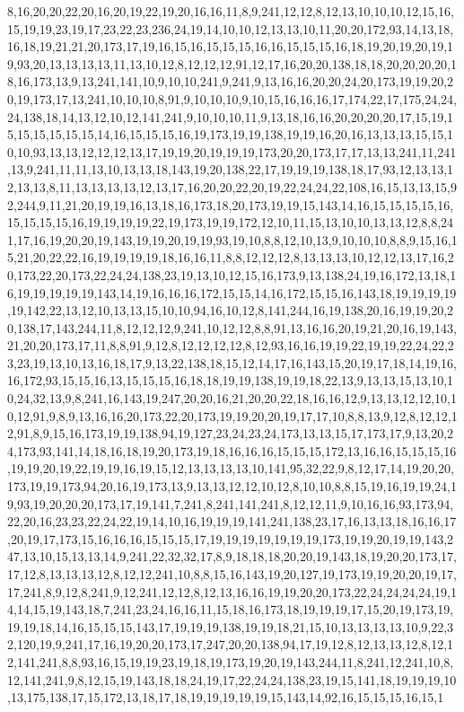 8,16,20,20,22,20,16,20,19,22,19,20,16,16,11,8,9,241,12,12,8,12,13,10,10,10,12,15,16,15,19,19,23,19,17,23,22,23,236,24,19,14,10,10,12,13,13,10,11,20,20,172,93,14,13,18,16,18,19,21,21,20,173,17,19,16,15,16,15,15,15,16,16,15,15,15,16,18,19,20,19,20,19,19,93,20,13,13,13,13,11,13,10,12,8,12,12,12,91,12,17,16,20,20,138,18,18,20,20,20,20,18,16,173,13,9,13,241,141,10,9,10,10,241,9,241,9,13,16,16,20,20,24,20,173,19,19,20,20,19,173,17,13,241,10,10,10,8,91,9,10,10,10,9,10,15,16,16,16,17,174,22,17,175,24,24,24,138,18,14,13,12,10,12,141,241,9,10,10,10,11,9,13,18,16,16,20,20,20,20,17,15,19,15,15,15,15,15,15,14,16,15,15,15,16,19,173,19,19,138,19,19,16,20,16,13,13,13,15,15,10,10,93,13,13,12,12,12,13,17,19,19,20,19,19,19,173,20,20,173,17,17,13,13,241,11,241,13,9,241,11,11,13,10,13,13,18,143,19,20,138,22,17,19,19,19,138,18,17,93,12,13,13,12,13,13,8,11,13,13,13,13,12,13,17,16,20,20,22,20,19,22,24,24,22,108,16,15,13,13,15,92,244,9,11,21,20,19,19,16,13,18,16,173,18,20,173,19,19,15,143,14,16,15,15,15,15,16,15,15,15,15,16,19,19,19,19,22,19,173,19,19,172,12,10,11,15,13,10,10,13,13,12,8,8,241,17,16,19,20,20,19,143,19,19,20,19,19,93,19,10,8,8,12,10,13,9,10,10,10,8,8,9,15,16,15,21,20,22,22,16,19,19,19,19,18,16,16,11,8,8,12,12,12,8,13,13,13,10,12,12,13,17,16,20,173,22,20,173,22,24,24,138,23,19,13,10,12,15,16,173,9,13,138,24,19,16,172,13,18,16,19,19,19,19,19,143,14,19,16,16,16,172,15,15,14,16,172,15,15,16,143,18,19,19,19,19,19,142,22,13,12,10,13,13,15,10,10,94,16,10,12,8,141,244,16,19,138,20,16,19,19,20,20,138,17,143,244,11,8,12,12,12,9,241,10,12,12,8,8,91,13,16,16,20,19,21,20,16,19,143,21,20,20,173,17,11,8,8,91,9,12,8,12,12,12,12,8,12,93,16,16,19,19,22,19,19,22,24,22,23,23,19,13,10,13,16,18,17,9,13,22,138,18,15,12,14,17,16,143,15,20,19,17,18,14,19,16,16,172,93,15,15,16,13,15,15,15,16,18,18,19,19,138,19,19,18,22,13,9,13,13,15,13,10,10,24,32,13,9,8,241,16,143,19,247,20,20,16,21,20,20,22,18,16,16,12,9,13,13,12,12,10,10,12,91,9,8,9,13,16,16,20,173,22,20,173,19,19,20,20,19,17,17,10,8,8,13,9,12,8,12,12,12,91,8,9,15,16,173,19,19,138,94,19,127,23,24,23,24,173,13,13,15,17,173,17,9,13,20,24,173,93,141,14,18,16,18,19,20,173,19,18,16,16,16,15,15,15,172,13,16,16,15,15,15,16,19,19,20,19,22,19,19,16,19,15,12,13,13,13,13,10,141,95,32,22,9,8,12,17,14,19,20,20,173,19,19,173,94,20,16,19,173,13,9,13,13,12,12,10,12,8,10,10,8,8,15,19,16,19,19,24,19,93,19,20,20,20,173,17,19,141,7,241,8,241,141,241,8,12,12,11,9,10,16,16,93,173,94,22,20,16,23,23,22,24,22,19,14,10,16,19,19,19,141,241,138,23,17,16,13,13,18,16,16,17,20,19,17,173,15,16,16,16,15,15,15,17,19,19,19,19,19,19,19,173,19,19,20,19,19,143,247,13,10,15,13,13,14,9,241,22,32,32,17,8,9,18,18,18,20,20,19,143,18,19,20,20,173,17,17,12,8,13,13,13,12,8,12,12,241,10,8,8,15,16,143,19,20,127,19,173,19,19,20,20,19,17,17,241,8,9,12,8,241,9,12,241,12,12,8,12,13,16,16,19,19,20,20,173,22,24,24,24,24,19,14,14,15,19,143,18,7,241,23,24,16,16,11,15,18,16,173,18,19,19,19,17,15,20,19,173,19,19,19,18,14,16,15,15,15,143,17,19,19,19,138,19,19,18,21,15,10,13,13,13,13,10,9,22,32,120,19,9,241,17,16,19,20,20,173,17,247,20,20,138,94,17,19,12,8,12,13,13,12,8,12,12,141,241,8,8,93,16,15,19,19,23,19,18,19,173,19,20,19,143,244,11,8,241,12,241,10,8,12,141,241,9,8,12,15,19,143,18,18,24,19,17,22,24,24,138,23,19,15,141,18,19,19,19,10,13,175,138,17,15,172,13,18,17,18,19,19,19,19,19,15,143,14,92,16,15,15,15,16,15,1
